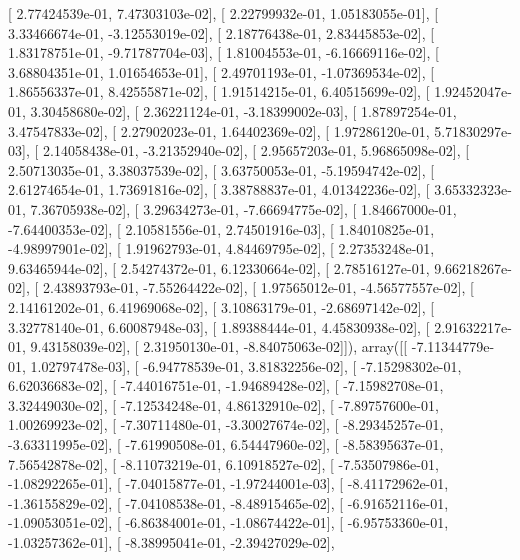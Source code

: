 \documentclass{article}
\begin{document}
       [  2.77424539e-01,   7.47303103e-02],
       [  2.22799932e-01,   1.05183055e-01],
       [  3.33466674e-01,  -3.12553019e-02],
       [  2.18776438e-01,   2.83445853e-02],
       [  1.83178751e-01,  -9.71787704e-03],
       [  1.81004553e-01,  -6.16669116e-02],
       [  3.68804351e-01,   1.01654653e-01],
       [  2.49701193e-01,  -1.07369534e-02],
       [  1.86556337e-01,   8.42555871e-02],
       [  1.91514215e-01,   6.40515699e-02],
       [  1.92452047e-01,   3.30458680e-02],
       [  2.36221124e-01,  -3.18399002e-03],
       [  1.87897254e-01,   3.47547833e-02],
       [  2.27902023e-01,   1.64402369e-02],
       [  1.97286120e-01,   5.71830297e-03],
       [  2.14058438e-01,  -3.21352940e-02],
       [  2.95657203e-01,   5.96865098e-02],
       [  2.50713035e-01,   3.38037539e-02],
       [  3.63750053e-01,  -5.19594742e-02],
       [  2.61274654e-01,   1.73691816e-02],
       [  3.38788837e-01,   4.01342236e-02],
       [  3.65332323e-01,   7.36705938e-02],
       [  3.29634273e-01,  -7.66694775e-02],
       [  1.84667000e-01,  -7.64400353e-02],
       [  2.10581556e-01,   2.74501916e-03],
       [  1.84010825e-01,  -4.98997901e-02],
       [  1.91962793e-01,   4.84469795e-02],
       [  2.27353248e-01,   9.63465944e-02],
       [  2.54274372e-01,   6.12330664e-02],
       [  2.78516127e-01,   9.66218267e-02],
       [  2.43893793e-01,  -7.55264422e-02],
       [  1.97565012e-01,  -4.56577557e-02],
       [  2.14161202e-01,   6.41969068e-02],
       [  3.10863179e-01,  -2.68697142e-02],
       [  3.32778140e-01,   6.60087948e-03],
       [  1.89388444e-01,   4.45830938e-02],
       [  2.91632217e-01,   9.43158039e-02],
       [  2.31950130e-01,  -8.84075063e-02]]), array([[ -7.11344779e-01,   1.02797478e-03],
       [ -6.94778539e-01,   3.81832256e-02],
       [ -7.15298302e-01,   6.62036683e-02],
       [ -7.44016751e-01,  -1.94689428e-02],
       [ -7.15982708e-01,   3.32449030e-02],
       [ -7.12534248e-01,   4.86132910e-02],
       [ -7.89757600e-01,   1.00269923e-02],
       [ -7.30711480e-01,  -3.30027674e-02],
       [ -8.29345257e-01,  -3.63311995e-02],
       [ -7.61990508e-01,   6.54447960e-02],
       [ -8.58395637e-01,   7.56542878e-02],
       [ -8.11073219e-01,   6.10918527e-02],
       [ -7.53507986e-01,  -1.08292265e-01],
       [ -7.04015877e-01,  -1.97244001e-03],
       [ -8.41172962e-01,  -1.36155829e-02],
       [ -7.04108538e-01,  -8.48915465e-02],
       [ -6.91652116e-01,  -1.09053051e-02],
       [ -6.86384001e-01,  -1.08674422e-01],
       [ -6.95753360e-01,  -1.03257362e-01],
       [ -8.38995041e-01,  -2.39427029e-02],
\end{document}
